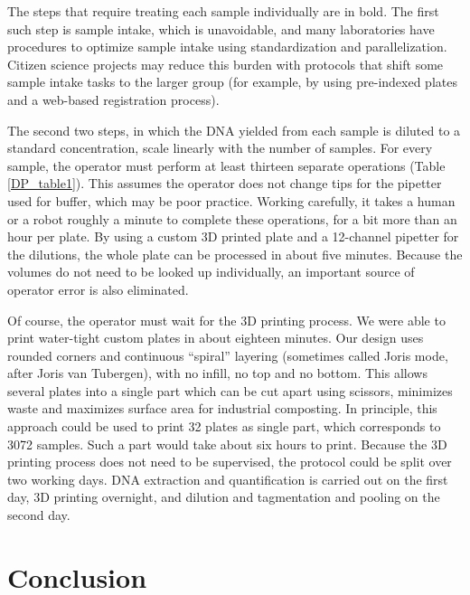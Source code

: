 \begin{refsection}
\noindent The steps that require treating each sample individually are in bold. The first such step is sample intake, which is unavoidable, and many laboratories have procedures to optimize sample intake using standardization and parallelization. Citizen science projects may reduce this burden with protocols that shift some sample intake tasks to the larger group (for example, by using pre-indexed plates and a web-based registration process). 

The second two steps, in which the DNA yielded from each sample is diluted to a standard concentration, scale linearly with the number of samples. For every sample, the operator must perform at least thirteen separate operations (Table \ref{DP_table1}). This assumes the operator does not change tips for the pipetter used for buffer, which may be poor practice. Working carefully, it takes a human or a robot roughly a minute to complete these operations, for a bit more than an hour per plate. By using a custom 3D printed plate and a 12-channel pipetter for the dilutions, the whole plate can be processed in about five minutes. Because the volumes do not need to be looked up individually, an important source of operator error is also eliminated.



Of course, the operator must wait for the 3D printing process. We were able to print water-tight custom plates in about eighteen minutes. Our design uses rounded corners and continuous ``spiral'' layering (sometimes called Joris mode, after Joris van Tubergen), with no infill, no top and no bottom. This allows several plates into a single part which can be cut apart using scissors, minimizes waste and maximizes surface area for industrial composting. In principle, this approach could be used to print 32 plates as single part, which corresponds to 3072 samples. Such a part would take about six hours to print. Because the 3D printing process does not need to be supervised, the protocol could be split over two working days. DNA extraction and quantification is carried out on the first day, 3D printing overnight, and dilution and tagmentation and pooling on the second day.

\section{Conclusion}



\end{refsection}
